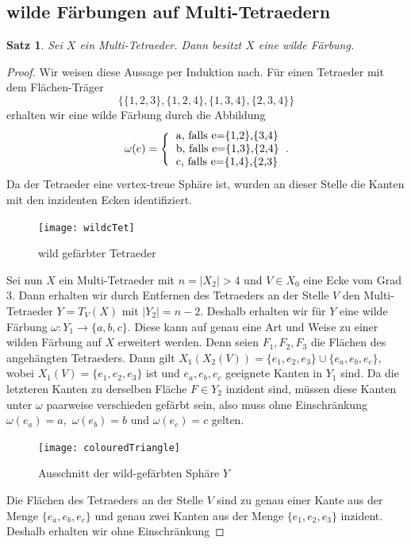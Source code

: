 \documentclass[12pt,titlepage,twoside,cleardoublepage]{article}
\theoremstyle{nummermitklammern}
\newtheorem{satz}[temp]{Satz}
\newtheorem{satz}[zahl]{Satz}
\numberwithin{equation}{section}
\begin{document}
\subsection{wilde Färbungen auf Multi-Tetraedern}
\begin{satz}\label{wild}
Sei $X$ ein Multi-Tetraeder. Dann besitzt $X$ eine wilde Färbung.
\end{satz}
\begin{proof}
Wir weisen diese Aussage per Induktion nach. Für einen Tetraeder mit dem Flächen-Träger
\[
\{\{1,2,3\},\{1,2,4\},\{1,3,4\},\{2,3,4\}\}
\] erhalten wir eine wilde Färbung durch die Abbildung
\begin{align*}
\omega(e)=\Biggl\{
\begin{tabular}[l]{lcr}
a, falls e=\{1,2\},\{3,4\}\\
b, falls e=\{1,3\},\{2,4\}\\
c, falls e=\{1,4\},\{2,3\}
\end{tabular}.
\end{align*}
Da der Tetraeder eine vertex-treue Sphäre ist, wurden an dieser Stelle die Kanten mit den inzidenten Ecken identifiziert.
\begin{figure}[H]
\begin{center}
\texttt{[image: wildcTet]}
\end{center}
\caption{wild gefärbter Tetraeder}
\end{figure}
Sei nun $X$ ein Multi-Tetraeder mit $n=\vert X_2 \vert >4$ und $V\in X_0$ eine Ecke vom Grad 3. Dann erhalten wir durch Entfernen des Tetraeders an der Stelle $V$ den Multi-Tetraeder $Y=T_V(X)$ mit $\vert Y_2 \vert=n-2.$ Deshalb erhalten wir für $Y$ eine wilde Färbung $\omega:Y_1\to \{a,b,c\}.$ Diese kann auf genau eine Art und Weise zu einer wilden Färbung auf $X$ erweitert werden.
Denn seien $F_1,F_2,F_3$ die Flächen des angehängten Tetraeders. Dann gilt $X_1(X_2(V))=\{e_1,e_2,e_3\}\cup \{e_a,e_b,e_c\},$ wobei $X_1(V)=\{e_1,e_2,e_3\}$ ist und $e_a,e_b,e_c$ geeignete Kanten in $Y_1$ sind. Da die letzteren Kanten zu derselben Fläche $F\in Y_2$ inzident sind, müssen diese Kanten unter $\omega$ paarweise verschieden gefärbt sein, also  muss ohne Einschränkung $
\omega(e_a)=a,$ $\omega(e_b)=b$ und $\omega(e_c)=c$
gelten.
\begin{figure}[H]
\begin{center}
\texttt{[image: colouredTriangle]}
\end{center}
\caption{Ausschnitt der wild-gefärbten Sphäre $Y$}
\end{figure}
Die Flächen des Tetraeders an der Stelle $V$ sind zu genau einer Kante aus der Menge $\{e_a,e_b,e_c\}$ und genau zwei Kanten aus der Menge $\{e_1,e_2,e_3\}$ inzident. Deshalb erhalten wir ohne Einschränkung 

\end{proof}
\end{document}

